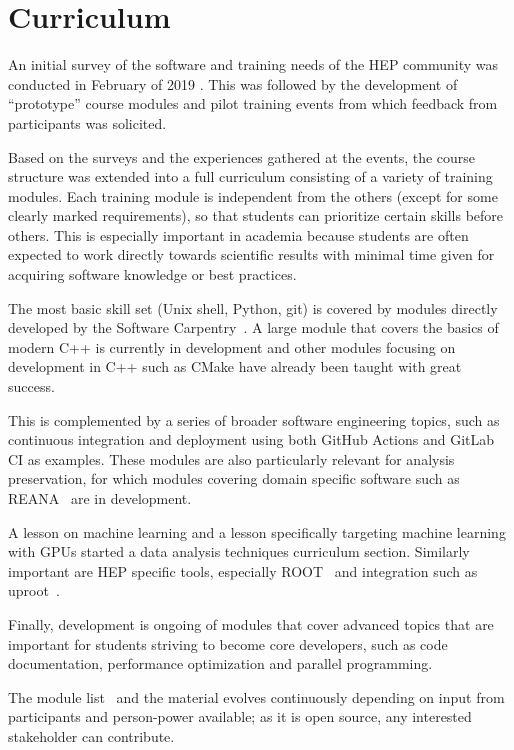 \documentclass[twocolumn]{svjour3}          %
\begin{document}
\section{Curriculum}\label{sec:Curriculum}

An initial survey of the software and training needs of the HEP community was conducted in February of 2019 \cite{david_lange}. This was followed by the development of \enquote{prototype} course modules and  pilot training events from which feedback from participants was solicited.

Based on the surveys and the experiences gathered at the events, the course structure was extended into a full curriculum consisting of a variety of training modules.
Each training module is independent from the others (except for some clearly marked requirements), so that students can prioritize certain skills before others. This is especially important in academia because students are often expected to work directly towards scientific results with minimal time given for acquiring software knowledge or best practices.

The most basic skill set (Unix shell, Python, git) is covered by modules directly developed by the Software Carpentry~\cite{softcarp}. A large module that covers the basics of modern C++ is currently in development and other modules focusing on development in C++ such as CMake have already been taught with great success.

This is complemented by a series of broader software engineering topics, such as continuous integration and deployment using both GitHub Actions and GitLab CI as examples. These modules are also particularly relevant for analysis preservation, for which modules covering domain specific software such as REANA~\cite{reana} are in development.

A lesson on machine learning and a lesson specifically targeting machine learning with GPUs started a data analysis techniques curriculum section. Similarly important are HEP specific tools, especially ROOT~\cite{root_cern} and integration such as uproot~\cite{uproot}.

Finally, development is ongoing of modules that cover advanced topics that are important for students striving to become core developers, such as code documentation, performance optimization and parallel programming.

The module list~\cite{HSF-curriculum} and the material evolves continuously depending on input from participants and person-power available; as it is open source, any interested stakeholder can contribute.
\end{document}
